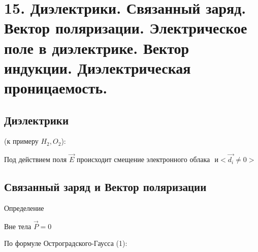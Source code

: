 \section*{15. Диэлектрики. Связанный заряд. Вектор поляризации. Электрическое поле
в диэлектрике. Вектор индукции. Диэлектрическая проницаемость.}

\subsection*{Диэлектрики}

(к примеру $H_2,O_2$):



Под действием поля $\vec{E}$ происходит смещение электронного облака
 $\text{ и}<\vec{d_i}\neq0>$




\newpage




\subsection*{Связанный заряд и Вектор поляризации}




Определение


Вне тела $\vec{P}=0$

\newpage


По формуле Остроградского-Гаусса (1):


